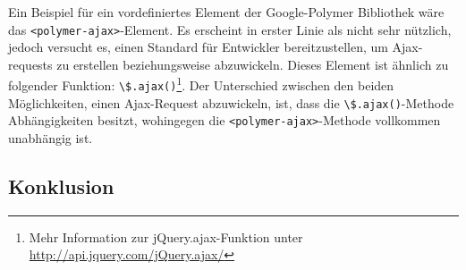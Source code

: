 \iffalse
In general, Polymer is a framework that aims to use (and show how to use) Web Components. It's foundation is Custom Elements (e.g. everything you build is a web component) and it evolves as the web evolves. To that end, we only support the latest version of the modern browsers.

I'll use this image to describe Polymer's entire architecture stack:

RED layer: We get tomorrow's web through a set of polyfills. Keep in mind, those libraries go away over time as browsers adopt the new APIs.

YELLOW layer: Sprinkle in some sugar with polymer.js. This layer is our opinion on how to use the spec'd APIs, together. It also adds things like data-binding, syntatic sugar, change watchers, published properties...We think these things are helpful for building web component-based apps.

GREEN: The comprehensive set of UI components (green layer) is still in progress. These will be web components that use all of the red + yellow layers.


How is Polymer different from Angular JS Directive? (Fundamentally and technologically)

Polymer (and more correctly, Shadow DOM) create the ability to not only compose bits of HTML, but to encapsulate them as well. This is a fundamentally new capability and one that can be used with any other templating system or framework to enhance their power.

In terms of templating/interpolation, Polymer uses MDV which does bi-directional data binding in a similar way to Angular for older browsers, but in newer runtimes can take advantage of Mutation Observers and eventually Object.observe() to help speed up change detection and propagation.
\fi



Ein Beispiel für ein vordefiniertes Element der Google-Polymer Bibliothek wäre das \lstinline|<polymer-ajax>|-Element. Es erscheint in erster Linie als nicht sehr nützlich, jedoch versucht es, einen Standard für Entwickler bereitzustellen, um Ajax-requests zu erstellen beziehungsweise abzuwickeln. Dieses Element ist ähnlich zu folgender Funktion: \lstinline|\$.ajax()|\footnote{Mehr Information zur jQuery.ajax-Funktion unter \href{http://api.jquery.com/jQuery.ajax/}{http://api.jquery.com/jQuery.ajax/}}. Der Unterschied zwischen den beiden Möglichkeiten, einen Ajax-Request abzuwickeln, ist, dass die \lstinline|\$.ajax()|-Methode Abhängigkeiten besitzt, wohingegen die \lstinline|<polymer-ajax>|-Methode vollkommen unabhängig ist.

\subsection{Konklusion}
\label{sec:3_Konklusion}



